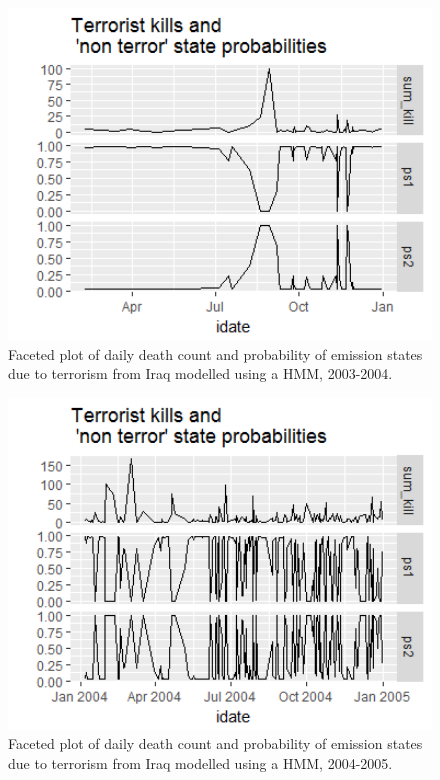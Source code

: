 \begin{figure}[t]
\includegraphics[width=15cm]{Peters_experiment_markdown_files/figure-latex/Rplot02_2003_2004.png}
\caption{Faceted plot of daily death count and probability of emission states due to terrorism from Iraq modelled using a HMM, 2003-2004.}
\label{fig:Rplot02_hmm_2003_2004}
\centering
\end{figure}

\begin{figure}[t]
\includegraphics[width=15cm]{Peters_experiment_markdown_files/figure-latex/Rplot02_2004_2005.png}
\caption{Faceted plot of daily death count and probability of emission states due to terrorism from Iraq modelled using a HMM, 2004-2005.}
\label{fig:Rplot02_2004_2005}
\centering
\end{figure}

